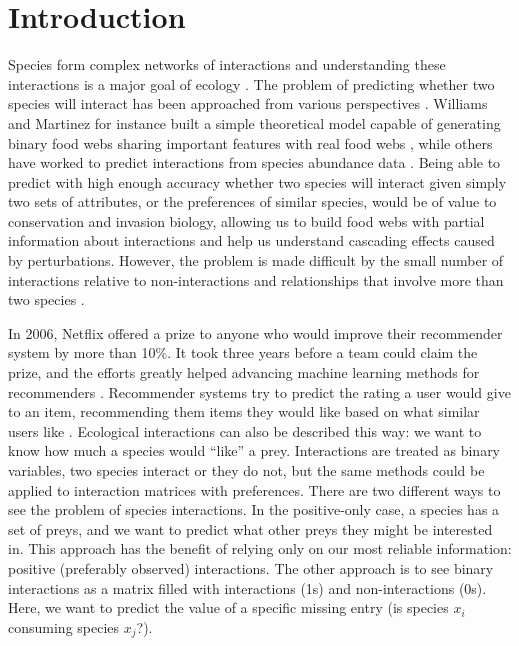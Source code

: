 \documentclass[letterpaper]{article}
\begin{document}
\section{Introduction}

Species form complex networks of interactions and understanding these
interactions is a major goal of ecology \cite{pim82}. The problem of predicting
whether two species will interact has been approached from various perspectives
\cite{bar16,mor15}. Williams and Martinez \cite{wil00} for instance built a
simple theoretical model capable of generating binary food webs sharing
important features with real food webs \cite{gra13}, while others have worked
to predict interactions from species abundance data \cite{ade12,can14}. Being
able to predict with high enough accuracy whether two species will interact
given simply two sets of attributes, or the preferences of similar species,
would be of value to conservation and invasion biology, allowing us to build
food webs with partial information about interactions and help us understand
cascading effects caused by perturbations. However, the problem is made
difficult by the small number of interactions relative to non-interactions and
relationships that involve more than two species \cite{gol16}.

In 2006, Netflix offered a prize to anyone who would improve their recommender
system by more than 10\%. It took three years before a team could claim the
prize, and the efforts greatly helped advancing machine learning methods for
recommenders \cite{mur12}. Recommender systems try to predict the rating a user
would give to an item, recommending them items they would like based on what
similar users like \cite{agg16}. Ecological interactions can also be described
this way: we want to know how much a species would ``like'' a prey.
Interactions are treated as binary variables, two species interact or they
do not, but the same methods could be applied to interaction matrices with
preferences. There are two different ways to see the problem of species
interactions. In the positive-only case, a species has a set of preys, and we
want to predict what other preys they might be interested in. This approach has
the benefit of relying only on our most reliable information: positive
(preferably observed) interactions. The other approach is to see binary
interactions as a matrix filled with interactions (1s) and non-interactions
(0s). Here, we want to predict the value of a specific missing entry (is
species $x_i$ consuming species $x_j$?).
\end{document}
